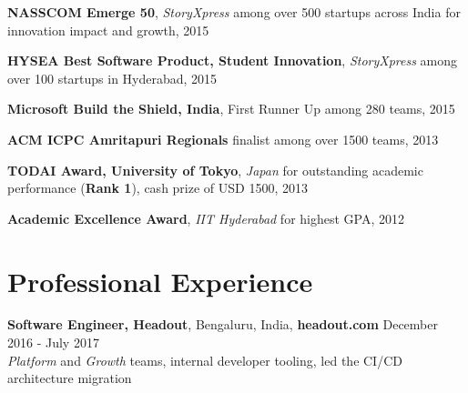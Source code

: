\documentclass[margin,line]{res}
\begin{document}
\begin{resume}
  {\bf NASSCOM Emerge 50}, {\it StoryXpress} among over 500 startups across India for innovation impact and growth, 2015

  \vspace*{-3.5mm}

  {\bf HYSEA Best Software Product, Student Innovation}, {\it StoryXpress} among over 100 startups in Hyderabad, 2015

  \vspace*{-3.5mm}

  {\bf Microsoft Build the Shield, India}, First Runner Up among 280 teams, 2015

  \vspace*{-3.5mm}

  \begin{comment}
  {\bf Best Science \& Technology Club}, Core Member, {\it Infero}, IIT Hyderabad for contributions to student community, 2014

  \vspace*{-3.5mm}
  \end{comment}

  {\bf ACM ICPC Amritapuri Regionals} finalist among over 1500 teams, 2013

  \vspace*{-3.5mm}

  {\bf TODAI Award, University of Tokyo}, {\it Japan} for outstanding academic performance ({\bf Rank 1}), cash prize of USD 1500, 2013

  \vspace*{-3.5mm}

  {\bf Academic Excellence Award}, {\it IIT Hyderabad} for highest GPA, 2012

  \vspace*{-3.5mm}

  \begin{comment}
  {\bf Top 0.5\%}, {\it IIT JEE} (0.5 million students) and {\bf Top 0.1\%}, {\it AIEEE} (1.2 million students), 2012

  \vspace*{-3.5mm}
  \end{comment}

\section{\sc Professional Experience}

  {\bf Software Engineer, Headout}, Bengaluru, India, \textbf{headout.com}  \hfill December 2016 - July 2017 \\
    {\it Platform} and {\it Growth} teams, internal developer tooling, led the CI/CD architecture migration


\end{resume}
\end{document}
